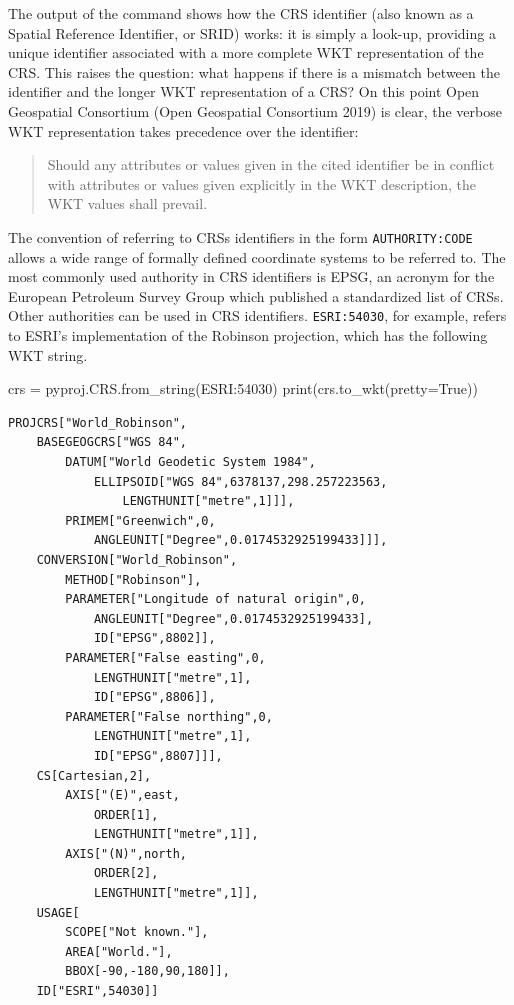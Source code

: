 \documentclass[
  letterpaper,
]{krantz}
\newenvironment{Shaded}{\begin{snugshade}}{\end{snugshade}}
\newcommand{\BuiltInTok}[1]{\textcolor[rgb]{0.00,0.23,0.31}{#1}}
\newcommand{\NormalTok}[1]{\textcolor[rgb]{0.00,0.23,0.31}{#1}}
\newcommand{\OperatorTok}[1]{\textcolor[rgb]{0.37,0.37,0.37}{#1}}
\newcommand{\StringTok}[1]{\textcolor[rgb]{0.13,0.47,0.30}{#1}}
\newcommand{\VariableTok}[1]{\textcolor[rgb]{0.07,0.07,0.07}{#1}}
\begin{document}
The output of the command shows how the CRS identifier (also known as a
Spatial Reference Identifier, or SRID) works: it is simply a look-up,
providing a unique identifier associated with a more complete WKT
representation of the CRS. This raises the question: what happens if
there is a mismatch between the identifier and the longer WKT
representation of a CRS? On this point Open Geospatial Consortium (Open
Geospatial Consortium 2019) is clear, the verbose WKT representation
takes precedence over the identifier:

\begin{quote}
Should any attributes or values given in the cited identifier be in
conflict with attributes or values given explicitly in the WKT
description, the WKT values shall prevail.
\end{quote}

The convention of referring to CRSs identifiers in the form
\texttt{AUTHORITY:CODE} allows a wide range of formally defined
coordinate systems to be referred to. The most commonly used authority
in CRS identifiers is EPSG, an acronym for the European Petroleum Survey
Group which published a standardized list of CRSs. Other authorities can
be used in CRS identifiers. \texttt{ESRI:54030}, for example, refers to
ESRI's implementation of the Robinson projection, which has the
following WKT string.

\begin{Shaded}
\begin{Highlighting}[]
\NormalTok{crs }\OperatorTok{=}\NormalTok{ pyproj.CRS.from\_string(}\StringTok{\textquotesingle{}ESRI:54030\textquotesingle{}}\NormalTok{)}
\BuiltInTok{print}\NormalTok{(crs.to\_wkt(pretty}\OperatorTok{=}\VariableTok{True}\NormalTok{))}
\end{Highlighting}
\end{Shaded}

\begin{verbatim}
PROJCRS["World_Robinson",
    BASEGEOGCRS["WGS 84",
        DATUM["World Geodetic System 1984",
            ELLIPSOID["WGS 84",6378137,298.257223563,
                LENGTHUNIT["metre",1]]],
        PRIMEM["Greenwich",0,
            ANGLEUNIT["Degree",0.0174532925199433]]],
    CONVERSION["World_Robinson",
        METHOD["Robinson"],
        PARAMETER["Longitude of natural origin",0,
            ANGLEUNIT["Degree",0.0174532925199433],
            ID["EPSG",8802]],
        PARAMETER["False easting",0,
            LENGTHUNIT["metre",1],
            ID["EPSG",8806]],
        PARAMETER["False northing",0,
            LENGTHUNIT["metre",1],
            ID["EPSG",8807]]],
    CS[Cartesian,2],
        AXIS["(E)",east,
            ORDER[1],
            LENGTHUNIT["metre",1]],
        AXIS["(N)",north,
            ORDER[2],
            LENGTHUNIT["metre",1]],
    USAGE[
        SCOPE["Not known."],
        AREA["World."],
        BBOX[-90,-180,90,180]],
    ID["ESRI",54030]]
\end{verbatim}
\end{document}
